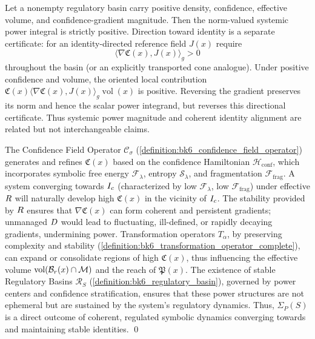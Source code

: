 \begin{proposition}
\label{proposition:bk7_power_from_coherent_confidence_regulation}
Let a nonempty regulatory basin carry positive density, confidence, effective
volume, and confidence-gradient magnitude.  Then the norm-valued systemic
power integral is strictly positive.  Direction toward identity is a separate
certificate: for an identity-directed reference field $J(x)$ require
\[
 \langle\nabla\mathfrak C(x),J(x)\rangle_g>0
\]
throughout the basin (or an explicitly transported cone analogue).  Under
positive confidence and volume, the oriented local contribution
$\mathfrak C(x)\langle\nabla\mathfrak C(x),J(x)\rangle_g\operatorname{vol}(x)$
is positive.  Reversing the gradient preserves its norm and hence the scalar
power integrand, but reverses this directional certificate.  Thus systemic
power magnitude and coherent identity alignment are related but not
interchangeable claims.
\end{proposition}
\begin{demonstratio}
\label{demonstratio:bk7_operator_basis_systemic_power}
The Confidence Field Operator \(\mathcal{C}_\sigma\) (\ref{definition:bk6_confidence_field_operator}) generates and refines \(\mathfrak{C}(x)\) based on the confidence Hamiltonian \(\mathcal{H}_{\text{conf}}\), which incorporates symbolic free energy \(\mathcal{F}_\lambda\), entropy \(\mathcal{S}_\lambda\), and fragmentation \(\mathcal{F}_{\text{frag}}\). A system converging towards \(I_c\) (characterized by low \(\mathcal{F}_\lambda\), low \(\mathcal{F}_{\text{frag}}\)) under effective \(R\) will naturally develop high \(\mathfrak{C}(x)\) in the vicinity of \(I_c\).
The stability provided by \(R\) ensures that \(\nabla \mathfrak{C}(x)\) can form coherent and persistent gradients; unmanaged \(D\) would lead to fluctuating, ill-defined, or rapidly decaying gradients, undermining power.
Transformation operators \(T_\alpha\), by preserving complexity and stability (\ref{definition:bk6_transformation_operator_complete}), can expand or consolidate regions of high \(\mathfrak{C}(x)\), thus influencing the effective volume \(\text{vol}(\mathcal{B}_r(x) \cap \mathcal{M})\) and the reach of \(\mathfrak{P}(x)\).
The existence of stable Regulatory Basins \(\mathcal{R}_S\) (\ref{definition:bk6_regulatory_basin}), governed by power centers and confidence stratification, ensures that these power structures are not ephemeral but are sustained by the system's regulatory dynamics. Thus, \(\Sigma_P(S)\) is a direct outcome of coherent, regulated symbolic dynamics converging towards and maintaining stable identities. \qed
\end{demonstratio}

